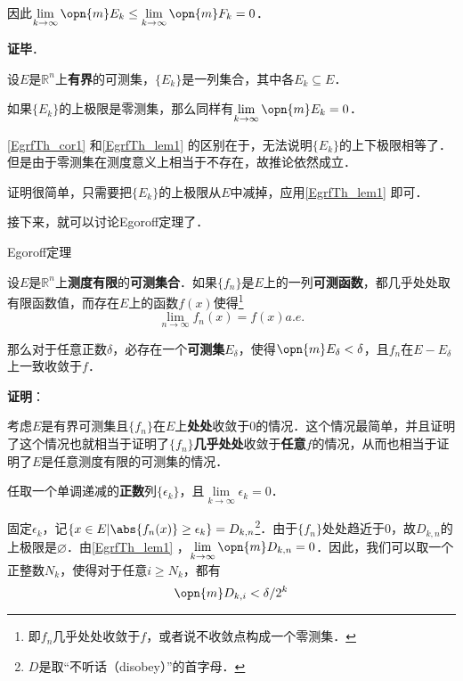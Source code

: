 因此$\lim\limits_{k\to\infty}\opn{m}E_k\leq\lim\limits_{k\to\infty}\opn{m}F_k=0$．


\textbf{证毕}．

\begin{corollary}{}\label{EgrfTh_cor1}
设$E$是$\mathbb{R}^n$上\textbf{有界}的可测集，$\{E_k\}$是一列集合，其中各$E_k\subseteq E$．

如果$\{E_k\}$的上极限是零测集，那么同样有$\lim\limits_{k\to\infty}\opn{m}E_k=0$．
\end{corollary}

\autoref{EgrfTh_cor1} 和\autoref{EgrfTh_lem1} 的区别在于，无法说明$\{E_k\}$的上下极限相等了．但是由于零测集在测度意义上相当于不存在，故推论依然成立．

证明很简单，只需要把$\{E_k\}$的上极限从$E$中减掉，应用\autoref{EgrfTh_lem1} 即可．





接下来，就可以讨论Egoroff定理了．


\begin{theorem}{Egoroff定理}\label{EgrfTh_the1}

设$E$是$\mathbb{R}^n$上\textbf{测度有限}的\textbf{可测集合}．如果$\{f_n\}$是$E$上的一列\textbf{可测函数}，都几乎处处取有限函数值，而存在$E$上的函数$f(x)$使得\footnote{即$f_n$几乎处处收敛于$f$，或者说不收敛点构成一个零测集．}\begin{equation}
\lim\limits_{n\to\infty}f_n(x)=f(x)a. e. 
\end{equation}

那么对于任意正数$\delta$，必存在一个\textbf{可测集}$E_\delta$，使得$\opn{m}E_\delta<\delta$，且$f_n$在$E-E_\delta$上一致收敛于$f$．

\end{theorem}

\textbf{证明}：

考虑$E$是有界可测集且$\{f_n\}$在$E$上\textbf{处处}收敛于$0$的情况．这个情况最简单，并且证明了这个情况也就相当于证明了$\{f_n\}$\textbf{几乎处处}收敛于\textbf{任意}$f$的情况，从而也相当于证明了$E$是任意测度有限的可测集的情况．



任取一个单调递减的\textbf{正数}列$\{\epsilon_k\}$，且$\lim\limits_{k\to\infty}\epsilon_k=0$．

固定$\epsilon_k$，记$\{x\in E|\abs{f_n(x)}\geq\epsilon_k\}=D_{k, n}$\footnote{$D$是取“不听话（disobey）”的首字母．}．由于$\{f_n\}$处处趋近于$0$，故$D_{k, n}$的上极限是$\varnothing$．由\autoref{EgrfTh_lem1} ，$\lim\limits_{k\to\infty}\opn{m}D_{k, n}=0$．因此，我们可以取一个正整数$N_k$，使得对于任意$i\geq N_k$，都有
\begin{equation}\label{EgrfTh_eq2}
\opn{m}D_{k, i}<\delta/2^k
\end{equation}

